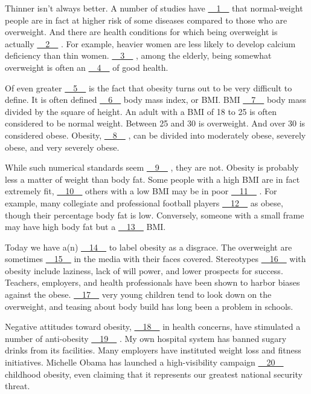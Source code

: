 Thinner isn't always better. A number of studies have \uline{~~1~~} that normal-weight people are in fact at higher risk of some diseases compared to those who are overweight. And there are health conditions for which being overweight is actually \uline{~~2~~} . For example, heavier women are less likely to develop calcium deficiency than thin women. \uline{~~3~~} , among the elderly, being somewhat overweight is often an \uline{~~4~~} of good health.


Of even greater \uline{~~5~~} is the fact that obesity turns out to be very difficult to define. It is often defined \uline{~~6~~} body mass index, or BMI. BMI \uline{~~7~~} body mass divided by the square of height. An adult with a BMI of 18 to 25 is often considered to be normal weight. Between 25 and 30 is overweight. And over 30 is considered obese. Obesity, \uline{~~8~~} , can be divided into moderately obese, severely obese, and very severely obese.


While such numerical standards seem \uline{~~9~~} , they are not. Obesity is probably less a matter of weight than body fat. Some people with a high BMI are in fact extremely fit, \uline{~~10~~} others with a low BMI may be in poor \uline{~~11~~} . For example, many collegiate and professional football players \uline{~~12~~} as obese, though their percentage body fat is low. Conversely, someone with a small frame may have high body fat but a \uline{~~13~~} BMI.


Today we have a(n) \uline{~~14~~} to label obesity as a disgrace. The overweight are sometimes \uline{~~15~~} in the media with their faces covered. Stereotypes \uline{~~16~~} with obesity include laziness, lack of will power, and lower prospects for success. Teachers, employers, and health professionals have been shown to harbor biases against the obese. \uline{~~17~~} very young children tend to look down on the overweight, and teasing about body build has long been a problem in schools.


Negative attitudes toward obesity, \uline{~~18~~} in health concerns, have stimulated a number of anti-obesity \uline{~~19~~} . My own hospital system has banned sugary drinks from its facilities. Many employers have instituted weight loss and fitness initiatives. Michelle Obama has launched a high-visibility campaign \uline{~~20~~} childhood obesity, even claiming that it represents our greatest national security threat.